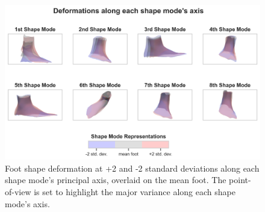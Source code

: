 \documentclass[preprint]{elsarticle}
\begin{document}
\newpage

\begin{figure}
\hypertarget{fig:pca_overlay}{%
\centering
\includegraphics[width=1\textwidth,height=\textheight]{fig/Fig7.png}
\caption{Foot shape deformation at +2 and -2 standard deviations along each shape mode's principal axis, overlaid on the mean foot. The point-of-view is set to highlight the major variance along each shape mode's axis.}\label{fig:pca_overlay}
}
\end{figure}



\end{document}
